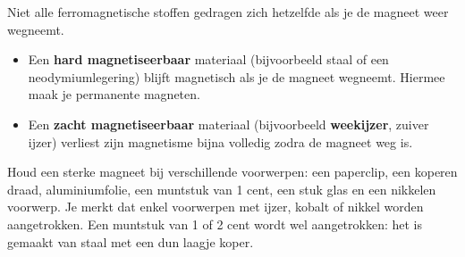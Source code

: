 \documentclass{ximera}
\begin{document}
Niet alle ferromagnetische stoffen gedragen zich hetzelfde als je de magneet weer wegneemt.

\begin{proposition}[foldable=true,title={Hard en zacht magnetiseerbaar materiaal}]\nl
    \begin{itemize}
        \item Een \textbf{hard magnetiseerbaar} materiaal (bijvoorbeeld staal of een neodymiumlegering) blijft magnetisch als je de magneet wegneemt. Hiermee maak je permanente magneten.
        \item Een \textbf{zacht magnetiseerbaar} materiaal (bijvoorbeeld \textbf{weekijzer}, zuiver ijzer) verliest zijn magnetisme bijna volledig zodra de magneet weg is.
    \end{itemize}
\end{proposition}

\begin{remark}[expandable=true,title={Proef: wat wordt aangetrokken?}]\nl
    Houd een sterke magneet bij verschillende voorwerpen: een paperclip, een koperen draad, aluminiumfolie, een muntstuk van 1 cent, een stuk glas en een nikkelen voorwerp. Je merkt dat enkel voorwerpen met ijzer, kobalt of nikkel worden aangetrokken. Een muntstuk van 1 of 2 cent wordt wel aangetrokken: het is gemaakt van staal met een dun laagje koper.
\end{remark}
\end{document}
